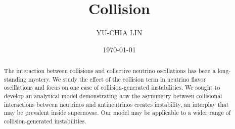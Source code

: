 \documentclass[aps,prd,twocolumn,amsmath,amssymb,groupedaddress]{revtex4-2}
\begin{document}

\title{Collision}


\author{YU-CHIA LIN}

\date{\today}

\begin{abstract}
The interaction between collisions and collective neutrino oscillations has been a long-standing mystery. We study the effect of the collision term in neutrino flavor oscillations and focus on one case of collision-generated instabilities.
We sought to develop an analytical model demonstrating how the asymmetry between collisional interactions between neutrinos and antineutrinos creates instability, an interplay that may be prevalent inside supernovae. Our model may be applicable to a wider range of collision-generated instabilities.
\end{abstract}

\maketitle
\end{document}
